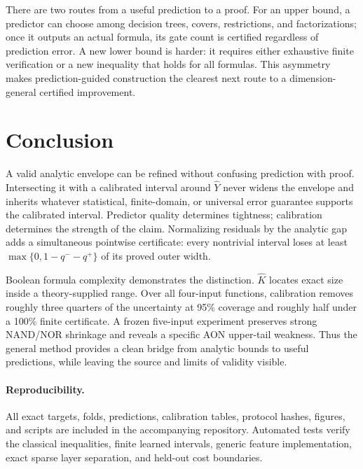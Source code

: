 \documentclass[10pt]{article}
\begin{document}
There are two routes from a useful prediction to a proof.  For an upper bound,
a predictor can choose among decision trees, covers, restrictions, and
factorizations; once it outputs an actual formula, its gate count is certified
regardless of prediction error.  A new lower bound is harder: it requires
either exhaustive finite verification or a new inequality that holds for all
formulas.  This asymmetry makes prediction-guided construction the clearest
next route to a dimension-general certified improvement.

\section{Conclusion}

A valid analytic envelope can be refined without confusing prediction with
proof.  Intersecting it with a calibrated interval around $\widehat Y$ never
widens the envelope and inherits whatever statistical, finite-domain, or
universal error guarantee supports the calibrated interval.  Predictor
quality determines tightness; calibration determines the strength of the
claim.  Normalizing residuals by the analytic gap adds a simultaneous
pointwise certificate: every nontrivial interval loses at least
$\max\{0,1-q^--q^+\}$ of its proved outer width.

Boolean formula complexity demonstrates the distinction.  $\widehat K$
locates exact size inside a theory-supplied range.  Over all four-input
functions, calibration removes roughly three quarters of the uncertainty at
95\% coverage and roughly half under a 100\% finite certificate.  A frozen
five-input experiment preserves strong NAND/NOR shrinkage and reveals a
specific AON upper-tail weakness.  Thus the general method provides a clean
bridge from analytic bounds to useful predictions, while leaving the source
and limits of validity visible.

\paragraph{Reproducibility.}
All exact targets, folds, predictions, calibration tables, protocol hashes,
figures, and scripts are included in the accompanying repository.  Automated
tests verify the classical inequalities, finite learned intervals, generic
feature implementation, exact sparse layer separation, and held-out cost
boundaries.
\end{document}
